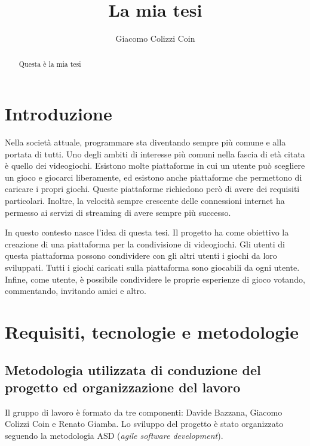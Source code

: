 \documentclass[binding=0.6cm,Lau]{sapthesis}
\title{La mia tesi}
\author{Giacomo Colizzi Coin}
\begin{document}
\frontmatter
\maketitle

\begin{abstract}
Questa è la mia tesi
\end{abstract}

\tableofcontents

\mainmatter
\chapter{Introduzione}

Nella società attuale, programmare sta diventando sempre più comune e
alla portata di tutti.
Uno degli ambiti di interesse più comuni nella fascia di età citata è
quello dei videogiochi. Esistono molte piattaforme in cui un utente
può scegliere un gioco e giocarci liberamente, ed esistono anche
piattaforme che permettono di caricare i propri giochi. Queste
piattaforme richiedono però di avere dei requisiti particolari.
Inoltre, la velocità sempre crescente delle connessioni internet ha
permesso ai servizi di streaming di avere sempre più successo.

In questo contesto nasce l'idea di questa tesi.
Il progetto ha come obiettivo la creazione di una piattaforma per la
condivisione di videogiochi. Gli utenti di questa piattaforma possono
condividere con gli altri utenti i giochi da loro sviluppati. Tutti i
giochi caricati sulla piattaforma sono giocabili da ogni utente.
Infine, come utente, è possibile condividere le proprie esperienze di
gioco votando, commentando, invitando amici e altro.

\chapter{Requisiti, tecnologie e metodologie}
\section{Metodologia utilizzata di conduzione del progetto ed organizzazione del lavoro}
Il gruppo di lavoro è formato da tre componenti: Davide Bazzana,
Giacomo Colizzi Coin e Renato Giamba.
\newline
\newline
Lo sviluppo del progetto è stato organizzato seguendo la metodologia
ASD (\textit{agile software development}).
\end{document}
